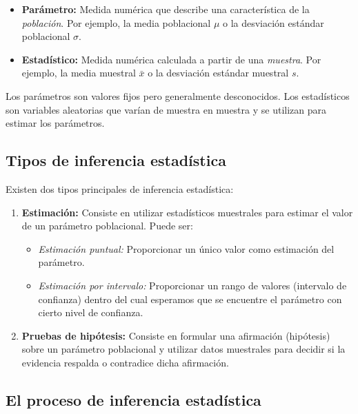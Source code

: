 \begin{definicion}
	\begin{itemize}
		\item \textbf{Parámetro:} Medida numérica que describe una característica de la \emph{población}. Por ejemplo, la media poblacional $\mu$ o la desviación estándar poblacional $\sigma$.
		\item \textbf{Estadístico:} Medida numérica calculada a partir de una \emph{muestra}. Por ejemplo, la media muestral $\bar{x}$ o la desviación estándar muestral $s$.
	\end{itemize}
\end{definicion}

\begin{observacion}
	Los parámetros son valores fijos pero generalmente desconocidos. Los estadísticos son variables aleatorias que varían de muestra en muestra y se utilizan para estimar los parámetros.
\end{observacion}

\subsection*{Tipos de inferencia estadística}

Existen dos tipos principales de inferencia estadística:

\begin{enumerate}
	\item \textbf{Estimación:} Consiste en utilizar estadísticos muestrales para estimar el valor de un parámetro poblacional. Puede ser:
	\begin{itemize}
		\item \emph{Estimación puntual:} Proporcionar un único valor como estimación del parámetro.
		\item \emph{Estimación por intervalo:} Proporcionar un rango de valores (intervalo de confianza) dentro del cual esperamos que se encuentre el parámetro con cierto nivel de confianza.
	\end{itemize}
	
	\item \textbf{Pruebas de hipótesis:} Consiste en formular una afirmación (hipótesis) sobre un parámetro poblacional y utilizar datos muestrales para decidir si la evidencia respalda o contradice dicha afirmación.
\end{enumerate}

\subsection*{El proceso de inferencia estadística}

